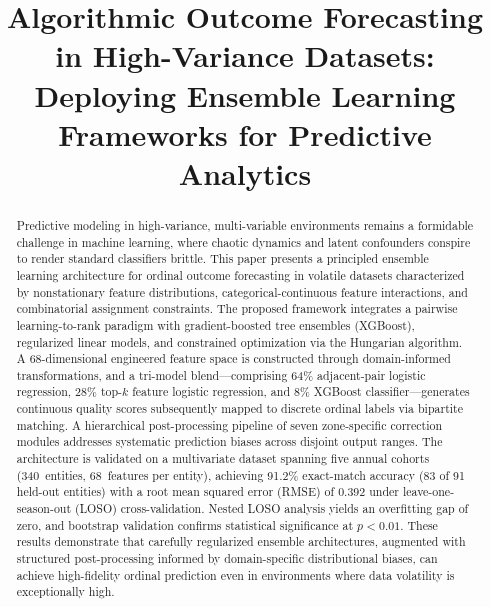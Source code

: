 \documentclass[conference]{IEEEtran}
\begin{document}
\title{Algorithmic Outcome Forecasting in High-Variance Datasets:\\ Deploying Ensemble Learning Frameworks for Predictive Analytics}

\author{
}

\maketitle

\begin{abstract}
Predictive modeling in high-variance, multi-variable environments remains a formidable challenge in machine learning, where chaotic dynamics and latent confounders conspire to render standard classifiers brittle. This paper presents a principled ensemble learning architecture for ordinal outcome forecasting in volatile datasets characterized by nonstationary feature distributions, categorical-continuous feature interactions, and combinatorial assignment constraints. The proposed framework integrates a pairwise learning-to-rank paradigm with gradient-boosted tree ensembles (XGBoost), regularized linear models, and constrained optimization via the Hungarian algorithm. A 68-dimensional engineered feature space is constructed through domain-informed transformations, and a tri-model blend---comprising 64\% adjacent-pair logistic regression, 28\% top-$k$ feature logistic regression, and 8\% XGBoost classifier---generates continuous quality scores subsequently mapped to discrete ordinal labels via bipartite matching. A hierarchical post-processing pipeline of seven zone-specific correction modules addresses systematic prediction biases across disjoint output ranges. The architecture is validated on a multivariate dataset spanning five annual cohorts (340~entities, 68~features per entity), achieving 91.2\% exact-match accuracy (83 of 91 held-out entities) with a root mean squared error (RMSE) of 0.392 under leave-one-season-out (LOSO) cross-validation. Nested LOSO analysis yields an overfitting gap of zero, and bootstrap validation confirms statistical significance at $p < 0.01$. These results demonstrate that carefully regularized ensemble architectures, augmented with structured post-processing informed by domain-specific distributional biases, can achieve high-fidelity ordinal prediction even in environments where data volatility is exceptionally high.
\end{abstract}
\end{document}
